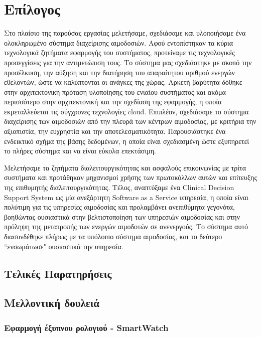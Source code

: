 \chapter{Επίλογος}\label{ch:conclusion}

		Στο πλαίσιο της παρούσας εργασίας μελετήσαμε, σχεδιάσαμε και υλοποιήσαμε ένα ολοκληρωμένο σύστημα διαχείρισης αιμοδοσιών. Αφού εντοπίστηκαν τα κύρια τεχνολογικά ζητήματα εφαρμογής του συστήματος, προτείναμε τις τεχνολογικές προσεγγίσεις για την αντιμετώπιση τους. Το σύστημα μας σχεδιάστηκε με σκοπό την προσέλκυση, την αύξηση και την διατήρηση του απαραίτητου αριθμού ενεργών εθελοντών, ώστε να καλύπτονται οι ανάγκες της χώρας. Αρκετή βαρύτητα δόθηκε στην αρχιτεκτονική πρόταση υλοποίησης του ενιαίου συστήματος και ακόμα περισσότερο στην αρχιτεκτονική και την σχεδίαση της εφαρμογής, η οποία εκμεταλλεύεται τις σύγχρονες τεχνολογίες cloud. Επιπλέον, σχεδιάσαμε το σύστημα διαχείρισης των αιμοδοσιών από την πλευρά των κέντρων αιμοδοσίας, με κριτήρια την αξιοπιστία, την ευχρηστία και την αποτελεσματικότητα. Παρουσιάστηκε ένα ενδεικτικό σχήμα της βάσης δεδομένων, η οποία είναι σχεδιασμένη ώστε εξυπηρετεί το πλήρες σύστημα και να είναι εύκολα επεκτάσιμη.
		
		Μελετήσαμε τα ζητήματα διαλειτουργικότητας και ασφαλούς επικοινωνίας με τρίτα συστήματα και προτάθηκαν μηχανισμοί χρήσης των πρωτοκόλλων αυτών και επίτευξης της επιθυμητής διαλειτουργικότητας. Τέλος, αναπτύξαμε ένα Clinical Decision Support System ως μία ανεξάρτητη Software as a Service υπηρεσία, η οποία είναι πολύτιμη για τις υπηρεσίες αιμοδοσίας και προλαμβάνει ανεπιθύμητα γεγονότα, βοηθώντας ουσιαστικά στην βελτιστοποίηση των υπηρεσιών αιμοδοσίας και στην πρόληψη  της μετατροπής των ενεργών αιμοδοτών σε ανενεργούς. Το σύστημα αυτό διασυνδέθηκε πλήρως με τα υπόλοιπο σύστημα αιμοδοσίας, και το δεύτερο ``ενσωμάτωσε" ουσιαστικά την υπηρεσία.
		
\section{Τελικές Παρατηρήσεις}



\section{Μελλοντική δουλειά}
	\subsection{Εφαρμογή έξυπνου ρολογιού - SmartWatch}
	
